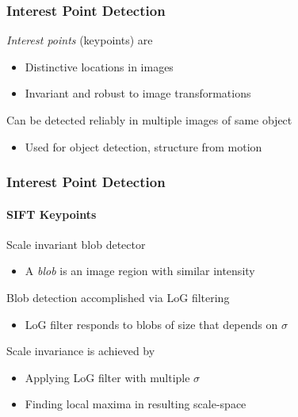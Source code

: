 \documentclass[xetex,professionalfont]{beamer}
\begin{document}

\begin{frame}
\frametitle{Interest Point Detection}

\emph{Interest points} (keypoints) are
\begin{itemize}
    \item Distinctive locations in images
    \item Invariant and robust to image transformations %
\end{itemize}

\bigskip
Can be detected reliably in multiple images of same object
\begin{itemize}
    \item Used for object detection, structure from motion
\end{itemize}

\end{frame}


\begin{frame}
\frametitle{Interest Point Detection}
\framesubtitle{SIFT Keypoints}

Scale invariant blob detector
\begin{itemize}
    \item A \emph{blob} is an image region with similar intensity %
\end{itemize}

\bigskip
Blob detection accomplished via LoG filtering
\begin{itemize}
    \item LoG filter responds to blobs of size that depends on $\sigma$
\end{itemize}

\bigskip
Scale invariance is achieved by
\begin{itemize}
    \item Applying LoG filter with multiple $\sigma$
    \item Finding local maxima in resulting scale-space
\end{itemize}


\end{frame}
\end{document}
